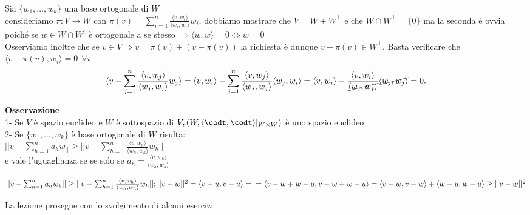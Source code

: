 \documentclass[12px]{article}
\theoremstyle{break}
\theoremstyle{break}
\theoremstyle{break}
\theoremstyle{break}
\theoremstyle{break}
\newtheorem*{dimo}{Dimostrazione}
\theoremstyle{break}
\newenvironment{dimo}
  {\begin{dimostrazione}}
  {\hfill\square\newline\end{dimostrazione}}
\begin{document}
	\begin{dimo}
		Sia $\{w_1,\ldots,w_k\}$ una base ortogonale di $W$ \\ consideriamo $\pi :V \rightarrow W$ con $ \pi(v) = \sum^n_{i=1}\frac{ \langle v, w_i \rangle }{ \langle w_i, w_i \rangle} w_i$, dobbiamo mostrare che $V = W + W^\perp$ e che $W\cap W^\perp = \{0\}$ ma la seconda è ovvia poiché se $w\in W\cap W^t$ è ortogonale a se stesso $ \Rightarrow \langle w, w \rangle = 0 \Leftrightarrow w = 0$\\
		Osserviamo inoltre che se $v\in V \Rightarrow  v = \pi(v) + (v - \pi(v))$ la richiesta è dunque $v - \pi(v)\in W^\perp$. Basta verificare che $ \langle v - \pi(v), w_i \rangle = 0 \ \ \forall i$
		\[
			\langle v - \sum^n_{j=1} \frac{ \langle v, w_j \rangle} {\langle w_j, w_j \rangle} w_j\rangle = \langle v, w_i \rangle  - \sum^n_{j=1} \frac{ \langle v, w_j \rangle }{ \langle w_j, w_j \rangle } \langle w_j, w_i \rangle  = \langle v, w_i \rangle  - \frac{\langle v,w_i\rangle }{\cancel{ \langle w_j, w_j \rangle }} \cancel{\langle w_j, w_j \rangle } =0
		.\]
	\end{dimo}
	\textbf{Osservazione}\\
	1- Se $V$ è spazio euclideo e $W$ è sottospazio di $V, \\(W, \langle \codt, \codt \rangle |_{W\times W})$ è uno spazio euclideo\\
	2- Se $\{w_1,\ldots, w_k\}$ è base ortogonale di $W$ risulta:\\ $|| v- \sum^n_{h=1}a_hw_||\geq||v - \sum^n_{h=1}\frac{ \langle v, w_h \rangle }{ \langle w_h, w_h \rangle} w_h||$ \\e vale l'uguaglianza se se solo se $a_h = \frac{ \langle v, w_h \rangle }{ \langle w_h, w_h \rangle }$
	\begin{dimo}[Punto 2]
		$||v - \sum^n_{h=1}a_hw_k||\geq||v-\sum^n_{h=1}\frac{ \langle v, w_h \rangle }{ \langle w_h, w_h \rangle }w_h||; \\ ||v-w||^2 = \langle v - u, v - u \rangle  =\\= \langle v - w + w - u, v - w + w - u \rangle = \langle v - w, v - w \rangle  + \langle w - u, w - u \rangle \geq ||v-w||^2$
	\end{dimo}
	La lezione prosegue con lo svolgimento di alcuni esercizi
\end{document}
